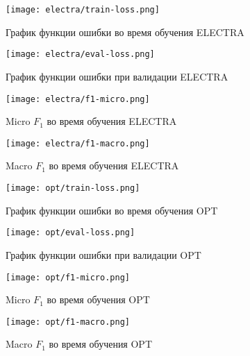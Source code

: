 \begin{figure}[!htb] 
   \begin{minipage}{0.48\textwidth} 
     \centering 
     \texttt{[image: electra/train-loss.png]}
     \caption{График функции ошибки во время обучения ELECTRA} 
   \end{minipage}\hfill 
   \begin{minipage}{0.48\textwidth} 
     \centering 
     \texttt{[image: electra/eval-loss.png]}
     \caption{График функции ошибки при валидации ELECTRA} 
   \end{minipage} 
\end{figure}

\begin{figure}[!htb] 
   \begin{minipage}{0.48\textwidth} 
     \centering 
     \texttt{[image: electra/f1-micro.png]}
     \caption{Micro $F_1$ во время обучения ELECTRA} 
   \end{minipage}\hfill 
   \begin{minipage}{0.48\textwidth} 
     \centering 
     \texttt{[image: electra/f1-macro.png]}
     \caption{Macro $F_1$ во время обучения ELECTRA} 
   \end{minipage} 
\end{figure}

\begin{figure}[!htb] 
   \begin{minipage}{0.48\textwidth} 
     \centering 
     \texttt{[image: opt/train-loss.png]}
     \caption{График функции ошибки во время обучения OPT} 
   \end{minipage}\hfill 
   \begin{minipage}{0.48\textwidth} 
     \centering 
     \texttt{[image: opt/eval-loss.png]}
     \caption{График функции ошибки при валидации OPT} 
   \end{minipage} 
\end{figure}

\begin{figure}[!htb] 
   \begin{minipage}{0.48\textwidth} 
     \centering 
     \texttt{[image: opt/f1-micro.png]}
     \caption{Micro $F_1$ во время обучения OPT} 
   \end{minipage}\hfill 
   \begin{minipage}{0.48\textwidth} 
     \centering 
     \texttt{[image: opt/f1-macro.png]}
     \caption{Macro $F_1$ во время обучения OPT} 
   \end{minipage} 
\end{figure}